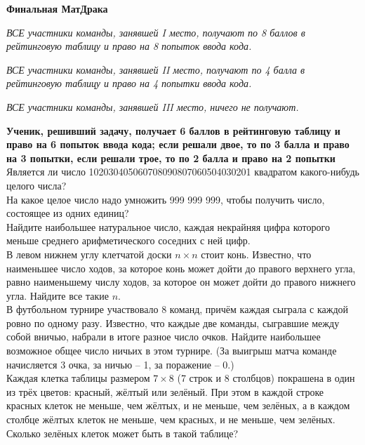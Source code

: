 \centerline{\bf \Huge Финальная МатДрака}

\textit{ВСЕ участники команды, занявшей I место, получают по 8 баллов в рейтинговую таблицу и право на 8 попыток ввода кода.}

\textit{ВСЕ участники команды, занявшей II место, получают по 4 балла в рейтинговую таблицу и право на 4 попытки ввода кода.}

\textit{ВСЕ участники команды, занявшей III место, ничего не получают.}

\textbf{Ученик, решивший задачу, получает 6 баллов в рейтинговую таблицу и право на 6 попыток ввода кода; если решали двое, то по 3 балла и право на 3 попытки, если решали трое, то по 2 балла и право на 2 попытки}\\

 Является ли число 102030405060708090807060504030201 квадратом какого-нибудь целого числа?\\


 На какое целое число надо умножить 999 999 999, чтобы получить число, состоящее из одних единиц?\\

 Найдите наибольшее натуральное число, каждая некрайняя цифра которого меньше среднего арифметического соседних с ней цифр.\\

 В левом нижнем углу клетчатой доски $n\times n$ стоит конь. Известно, что наименьшее число ходов, за которое конь может дойти до правого верхнего угла, равно наименьшему числу ходов, за которое он может дойти до правого нижнего угла. Найдите все такие $n$.\\

 В футбольном турнире участвовало 8 команд, причём каждая сыграла с каждой ровно по одному разу. Известно, что каждые две команды, сыгравшие между собой вничью, набрали в итоге разное число очков. Найдите наибольшее возможное общее число ничьих в этом турнире. (За выигрыш матча команде начисляется 3 очка, за ничью – 1, за поражение – 0.)\\




 Каждая клетка таблицы размером $7\times8$ (7 строк и 8 столбцов) покрашена в один из трёх цветов: красный, жёлтый или зелёный. При этом в каждой строке красных клеток не меньше, чем жёлтых, и не меньше, чем зелёных, а в каждом столбце жёлтых клеток не меньше, чем красных, и не меньше, чем зелёных. Сколько зелёных клеток может быть в такой таблице?\\






